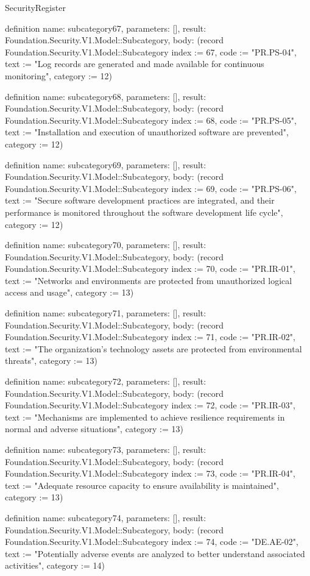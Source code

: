 \begin{lexlean}{SecurityRegister}
\begin{semanticmodule}
definition{
  name: subcategory67,
  parameters: [],
  result: Foundation.Security.V1.Model::Subcategory,
  body: (record Foundation.Security.V1.Model::Subcategory {index := 67, code := "PR.PS-04", text := "Log records are generated and made available for continuous monitoring", category := 12})
}

definition{
  name: subcategory68,
  parameters: [],
  result: Foundation.Security.V1.Model::Subcategory,
  body: (record Foundation.Security.V1.Model::Subcategory {index := 68, code := "PR.PS-05", text := "Installation and execution of unauthorized software are prevented", category := 12})
}

definition{
  name: subcategory69,
  parameters: [],
  result: Foundation.Security.V1.Model::Subcategory,
  body: (record Foundation.Security.V1.Model::Subcategory {index := 69, code := "PR.PS-06", text := "Secure software development practices are integrated, and their performance is monitored throughout the software development life cycle", category := 12})
}

definition{
  name: subcategory70,
  parameters: [],
  result: Foundation.Security.V1.Model::Subcategory,
  body: (record Foundation.Security.V1.Model::Subcategory {index := 70, code := "PR.IR-01", text := "Networks and environments are protected from unauthorized logical access and usage", category := 13})
}

definition{
  name: subcategory71,
  parameters: [],
  result: Foundation.Security.V1.Model::Subcategory,
  body: (record Foundation.Security.V1.Model::Subcategory {index := 71, code := "PR.IR-02", text := "The organization's technology assets are protected from environmental threats", category := 13})
}

definition{
  name: subcategory72,
  parameters: [],
  result: Foundation.Security.V1.Model::Subcategory,
  body: (record Foundation.Security.V1.Model::Subcategory {index := 72, code := "PR.IR-03", text := "Mechanisms are implemented to achieve resilience requirements in normal and adverse situations", category := 13})
}

definition{
  name: subcategory73,
  parameters: [],
  result: Foundation.Security.V1.Model::Subcategory,
  body: (record Foundation.Security.V1.Model::Subcategory {index := 73, code := "PR.IR-04", text := "Adequate resource capacity to ensure availability is maintained", category := 13})
}

definition{
  name: subcategory74,
  parameters: [],
  result: Foundation.Security.V1.Model::Subcategory,
  body: (record Foundation.Security.V1.Model::Subcategory {index := 74, code := "DE.AE-02", text := "Potentially adverse events are analyzed to better understand associated activities", category := 14})
}


\end{semanticmodule}
\end{lexlean}
